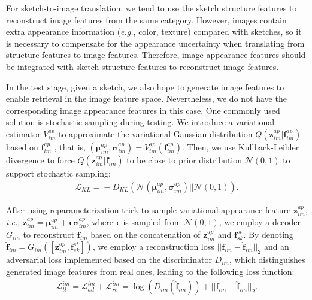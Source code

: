 \documentclass[10pt,twocolumn,letterpaper]{article}
\begin{document}
For sketch-to-image translation, we tend to use the sketch structure features to reconstruct image features from the same category. 
However, images contain extra appearance information (\emph{e.g.}, color, texture) compared with sketches, so it is necessary to compensate for the appearance uncertainty when translating from structure features to image features. 
Therefore, image appearance features should be integrated with sketch structure features to reconstruct image features. 

In the test stage, given a sketch, we also hope to generate image features to enable retrieval in the image feature space. Nevertheless, we do not have the corresponding image appearance features in this case. One commonly used solution is stochastic sampling during testing. We introduce a variational estimator $V_{im}^{ap}$ to approximate the variational Gaussian distribution $Q(\mathbf{z}_{im}^{ap}|\mathbf{f}_{im}^{ap})$ based on $\mathbf{f}_{im}^{ap}$ , that is, $(\bm{\mu}_{im}^{ap}, \bm{\sigma}_{im}^{ap})= V_{im}^{ap}(\mathbf{f}_{im}^{ap})$. Then, we use Kullback-Leibler divergence to force  $Q(\mathbf{z}_{im}^{ap}|\mathbf{f}_{im})$ to be close to prior distribution $\mathcal{N}(0, 1)$ to support stochastic sampling:
\vspace{-4pt}
\begin{align}
    \mathcal{L}_{KL} = \!-\!D_{KL}(\mathcal{N}(\bm{\mu}_{im}^{ap}, \bm{\sigma}_{im}^{ap}) || \mathcal{N}(0, 1)).
\end{align}

After using reparameterization trick \cite{kingma2013auto} to sample variational appearance feature  $\mathbf{z}_{im}^{ap}$, \emph{i.e.}, $\mathbf{z}_{im}^{ap}=\bm{\mu}_{im}^{ap}+\bm{\epsilon} \bm{\sigma}_{im}^{ap}$, where $\bm{\epsilon}$ is sampled from $\mathcal{N}(0,1)$, we employ a decoder $G_{im}$ to reconstruct $\mathbf{f}_{im}$ based on the concatenation of $\mathbf{z}_{im}^{ap}$ and $\mathbf{f}_{sk}^{st}$.  
By denoting $\hat{\mathbf{f}}_{im} = G_{im}([\mathbf{z}_{im}^{ap}, \mathbf{f}_{sk}^{st}])$, we employ a reconstruction loss $||\mathbf{f}_{im}\!-\!\hat{\mathbf{f}}_{im}||_2$ and an adversarial loss implemented based on the discriminator $D_{im}$, which distinguishes generated image features from real ones, leading to the following loss function:
\vspace{-4pt}
\begin{align} \label{eqn:7}
    \mathcal{L}_{tl}^{im}\!=\!\mathcal{L}_{ad}^{im}\!+\!\mathcal{L}_{re}^{im} \!=\!\log(D_{im}(\hat{\mathbf{f}}_{im})) \!+\! ||\mathbf{f}_{im}\!-\!\hat{\mathbf{f}}_{im}||_2.
\end{align}
\end{document}
